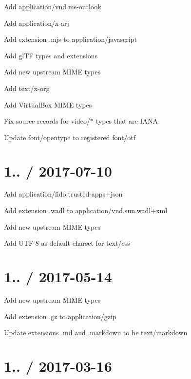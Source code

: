 \begin{DoxyItemize}
\item Add {\ttfamily application/vnd.\+ms-\/outlook}
\item Add {\ttfamily application/x-\/arj}
\item Add extension {\ttfamily .mjs} to {\ttfamily application/javascript}
\item Add gl\+TF types and extensions
\item Add new upstream M\+I\+ME types
\item Add {\ttfamily text/x-\/org}
\item Add Virtual\+Box M\+I\+ME types
\item Fix {\ttfamily source} records for {\ttfamily video/$\ast$} types that are I\+A\+NA
\item Update {\ttfamily font/opentype} to registered {\ttfamily font/otf}
\end{DoxyItemize}

\section*{1.. / 2017-\/07-\/10 }


\begin{DoxyItemize}
\item Add {\ttfamily application/fido.\+trusted-\/apps+json}
\item Add extension {\ttfamily .wadl} to {\ttfamily application/vnd.\+sun.\+wadl+xml}
\item Add new upstream M\+I\+ME types
\item Add {\ttfamily U\+T\+F-\/8} as default charset for {\ttfamily text/css}
\end{DoxyItemize}

\section*{1.. / 2017-\/05-\/14 }


\begin{DoxyItemize}
\item Add new upstream M\+I\+ME types
\item Add extension {\ttfamily .gz} to {\ttfamily application/gzip}
\item Update extensions {\ttfamily .md} and {\ttfamily .markdown} to be {\ttfamily text/markdown}
\end{DoxyItemize}

\section*{1.. / 2017-\/03-\/16 }


